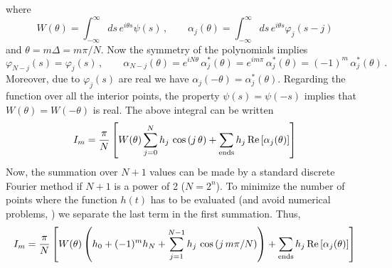 where
\[
W(\theta) = \int_{-\infty}^{\infty} d s \, e^{i \theta s} \psi(s) \, , \qquad
\alpha_{j}(\theta) = \int_{-\infty}^{\infty} d s \, e^{i \theta s} \varphi_{j}(s-j)
\]
%
and $\theta = m \Delta = m \pi/N$. Now the symmetry of the polynomials implies
\cite[see][]{Press1966_NRIvI}
%
\begin{equation}\label{Q:NMI1}
  \varphi_{N-j}(s)=\varphi_{j}(s)\,, \qquad \alpha_{N-j}(\theta) =
  e^{i N \theta} \, \alpha_{j}^{*}(\theta) = e^{i m \pi} \,
  \alpha_{j}^{*}(\theta) = (-1)^{m}\, \alpha_{j}^{*}(\theta) \,.
\end{equation}
Moreover, due to $\varphi_{j}(s)$ are real we have $\alpha_{j}(-\theta) =
\alpha_{j}^{*}(\theta)$. Regarding the function over all the interior points, the property
$\psi(s)=\psi(-s)$ implies that $W(\theta)=W(-\theta)$ is real. The above integral can be
written
\[
I_{m} = \frac{\pi}{N} \left[W(\theta) \sum_{j=0}^{N} h_{j} \, \cos{(j\,\theta)} +
  \sum_{\mathrm{ends}} h_{j} \, \mathrm{Re}\left[  \alpha_{j}(\theta) \right] \right]
\]
Now, the summation over $N+1$ values can be made by a standard discrete Fourier method if
$N+1$ is a power of 2 ($N=2^{n}$). To minimize the number of points where the function
$h(t)$ has to be evaluated (and avoid numerical problems,
\cite[see][(13.9.14)]{Press1966_NRIvI}) we separate the last term in the first
summation. Thus,
\[
I_{m} = \frac{\pi}{N} \left[W(\theta) \left( h_{0} + (-1)^{m} h_{N} + \sum_{j=1}^{N-1}
    h_{j} \, \cos{(j\,m \pi/N)} \right) + \sum_{\mathrm{ends}} h_{j} \,
  \mathrm{Re}\left[ \alpha_{j}(\theta) \right] \right]
\]

